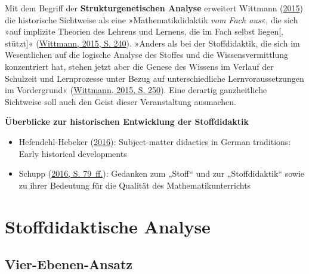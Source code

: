 \documentclass[
]{scrbook}
\providecommand{\tightlist}{%
  \setlength{\itemsep}{0pt}\setlength{\parskip}{0pt}}
\renewenvironment{quote}{
  \list{}{
	\leftmargin0.2cm   %
    \rightmargin\leftmargin
      	\def\FrameCommand
    {%
        {\color{quoteColor}\vrule width 2pt}%
        \hspace{0pt}%
    }%
    \MakeFramed{\advance \hsize -\width \FrameRestore}    \color{quoteColor}
    }
  \item\relax
}
{\endlist\color{black}\endMakeFramed}
\theoremstyle{definition}
\theoremstyle{definition}
\theoremstyle{definition}
\theoremstyle{definition}
\theoremstyle{remark}
\begin{document}
Mit dem Begriff der \textbf{Strukturgenetischen Analyse} erweitert Wittmann (\protect\hyperlink{ref-Wittmann:2015}{2015}) die historische Sichtweise als eine »Mathematikdidaktik \emph{vom Fach aus}«, die sich »auf implizite Theorien des Lehrens und Lernens, die im Fach selbst liegen{[}, stützt{]}« (\protect\hyperlink{ref-Wittmann:2015}{Wittmann, 2015, S. 240}). »Anders als bei der Stoffdidaktik, die sich im Wesentlichen auf die logische Analyse des Stoffes und die Wissensvermittlung konzentriert hat, stehen jetzt aber die Genese des Wissens im Verlauf der Schulzeit und Lernprozesse unter Bezug auf unterschiedliche Lernvoraussetzungen im Vordergrund« (\protect\hyperlink{ref-Wittmann:2015}{Wittmann, 2015, S. 250}). Eine derartig ganzheitliche Sichtweise soll auch den Geist dieser Veranstaltung ausmachen.

\begin{quote}
\textbf{Überblicke zur historischen Entwicklung der Stoffdidaktik}

\begin{itemize}
\tightlist
\item
  Hefendehl-Hebeker (\protect\hyperlink{ref-Hefendehl-Hebeker:2016}{2016}): Subject-matter didactics in German traditions: Early historical developments
\item
  Schupp (\protect\hyperlink{ref-Schupp:2016}{2016, S. 79~ff.}): Gedanken zum „Stoff`` und zur „Stoffdidaktik`` sowie zu ihrer Bedeutung für die Qualität des Mathematikunterrichts
\end{itemize}
\end{quote}

\hypertarget{part-stoffdidaktische-analyse}{%
\part*{Stoffdidaktische Analyse}\label{part-stoffdidaktische-analyse}}

\hypertarget{vier-ebenen-ansatz}{%
\chapter{Vier-Ebenen-Ansatz}\label{vier-ebenen-ansatz}}
\end{document}
